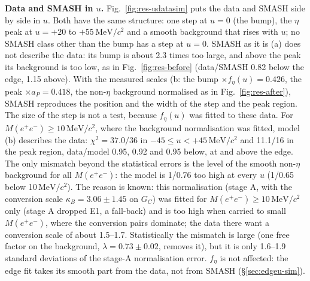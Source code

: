 \documentclass[11pt,a4paper]{article}
\newcommand{\Mee}{\ensuremath{M(e^{+}e^{-})}\xspace}
\newcommand{\MeVcc}{\ensuremath{\mathrm{MeV}/c^{2}}\xspace}
\newcommand{\aP}{\ensuremath{a_P}\xspace}
\newcommand{\kB}{\ensuremath{\kappa_B}\xspace}
\begin{document}
\textbf{Data and SMASH in $u$.} Fig.~\ref{fig:res-udatasim} puts the data and SMASH side by side in $u$. Both have the same structure: one step
at $u=0$ (the bump), the $\eta$ peak at $u=+20$ to $+55$\,\MeVcc and a smooth background that rises with $u$; no SMASH class other than the bump
has a step at $u=0$. SMASH as it is (a) does not describe the data: its bump is about 2.3 times too large, and above the peak its background is
too low, as in Fig.~\ref{fig:res-before} (data/SMASH 0.82 below the edge, 1.15 above). With the measured scales (b: the bump $\times
f_\eta(u)=0.426$, the peak $\times\aP=0.418$, the non-$\eta$ background normalised as in Fig.~\ref{fig:res-after}), SMASH reproduces the
position and the width of the step and the peak region. The size of the step is not a test, because $f_\eta(u)$ was fitted to these data. For
\Mee$\ge10$\,\MeVcc, where the background normalisation was fitted, model (b) describes the data: $\chi^2=37.0/36$ in $-45\le u<+45$\,\MeVcc
and 11.1/16 in the peak region, data/model 0.95, 0.92 and 0.95 below, at and above the edge. The only mismatch beyond the statistical errors is
the level of the smooth non-$\eta$ background for all \Mee: the model is 1/0.76 too high at every $u$ (1/0.65 below 10\,\MeVcc). The reason is
known: this normalisation (stage A, with the conversion scale $\kB=3.06\pm1.45$ on $G_C$) was fitted for \Mee$\ge10$\,\MeVcc only (stage A
dropped E1, a fall-back) and is too high when carried to small \Mee, where the conversion pairs dominate; the data there want a conversion
scale of about 1.5--1.7. Statistically the mismatch is large (one free factor on the background, $\lambda=0.73\pm0.02$, removes it), but it is
only 1.6--1.9 standard deviations of the stage-A normalisation error. $f_\eta$ is not affected: the edge fit takes its smooth part from the
data, not from SMASH (\S\ref{sec:edgeu-sim}).
\end{document}
